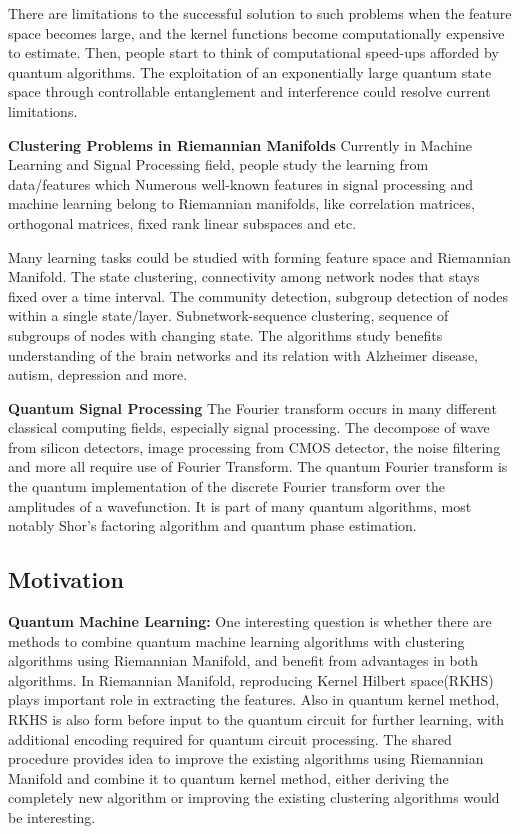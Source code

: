 \documentclass{article}
\begin{document}
There are limitations to the successful 
solution to such problems when the feature space becomes large, 
and the kernel functions become computationally expensive to estimate. 
Then, people start to think of computational speed-ups afforded by 
quantum algorithms. The exploitation of an exponentially 
large quantum state space through controllable 
entanglement and interference could resolve current limitations. 

\textbf{Clustering Problems in Riemannian Manifolds}
Currently in Machine Learning and Signal Processing field, 
people study the learning from data/features which 
Numerous well-known features in signal processing 
and machine learning belong to Riemannian manifolds, like 
correlation matrices, orthogonal matrices, fixed rank linear 
subspaces and etc. 

Many learning tasks could be studied with forming feature 
space and Riemannian Manifold. The state clustering, 
connectivity among network nodes that stays fixed over a 
time interval. The community detection, subgroup detection 
of nodes within a single state/layer. Subnetwork-sequence 
clustering, sequence of subgroups of nodes with changing state. 
The algorithms study benefits understanding of the brain networks 
and its relation with Alzheimer disease, autism, depression and more.

\textbf{Quantum Signal Processing}
The Fourier transform occurs in many different classical computing 
fields, especially signal processing. The decompose of wave from 
silicon detectors, image processing from CMOS detector, the noise filtering
and more all require use of Fourier Transform. The quantum Fourier 
transform is the quantum implementation of the discrete Fourier 
transform over the amplitudes of a wavefunction. It is part of 
many quantum algorithms, most notably Shor's factoring algorithm
and quantum phase estimation. 

 
\subsection{Motivation}

\textbf{Quantum Machine Learning:}  One interesting question is 
whether there are methods to 
combine quantum machine learning algorithms with clustering 
algorithms using Riemannian Manifold, and benefit from 
advantages in both algorithms. In Riemannian Manifold, 
reproducing Kernel Hilbert space(RKHS)
plays important role in extracting the 
features. Also in quantum kernel method, RKHS is also 
form before input to the quantum circuit for further learning, 
with additional encoding required for quantum circuit processing. 
The shared procedure provides idea to improve the existing 
algorithms using Riemannian Manifold and combine it to 
quantum kernel method, either deriving the completely new algorithm or 
improving the existing clustering algorithms would be interesting. 
\end{document}
